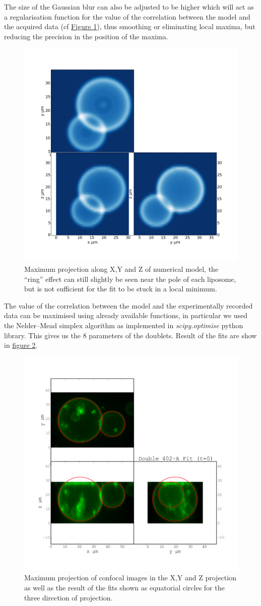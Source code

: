 \documentclass[A4paperpaper,11pt,english]{sphinxmanual}
\begin{document}
The size of the
Gaussian blur can also be adjusted to be higher which will act as a regularisation
function for the value of the correlation between the model and the acquired
data (cf \hyperref[index-latex:max-proj-model]{Figure  \ref*{index-latex:max-proj-model}}), thus smoothing or eliminating local maxima,
but reducing the precision in the position of the maxima.
\begin{figure}[htbp]
\centering
\capstart

\includegraphics[width=0.500\linewidth]{max_proj_model.png}
\caption{Maximum projection along X,Y and Z of numerical model, the ``ring'' effect
can still slightly be seen near the pole of each liposome, but is not
sufficient for the fit to be stuck in a local minimum.}\label{index-latex:max-proj-model}\end{figure}

The value of the correlation between the model and the experimentally recorded
data can be maximised using already available functions, in particular we used
the Nelder–Mead simplex algorithm as implemented in \emph{scipy.optimise} python library. This
gives us the 8 parameters of the doublets. Result of the fits are show in
\hyperref[index-latex:fig-fit-t0]{figure  \ref*{index-latex:fig-fit-t0}}.
\begin{figure}[htbp]
\centering
\capstart

\includegraphics[width=0.500\linewidth]{Doublet-402-A-Fit-t-0.png}
\caption{Maximum projection of confocal images in the X,Y and Z projection as well
as the result of the fits shown as equatorial circles for the three
direction of projection.}\label{index-latex:fig-fit-t0}\end{figure}
\end{document}

